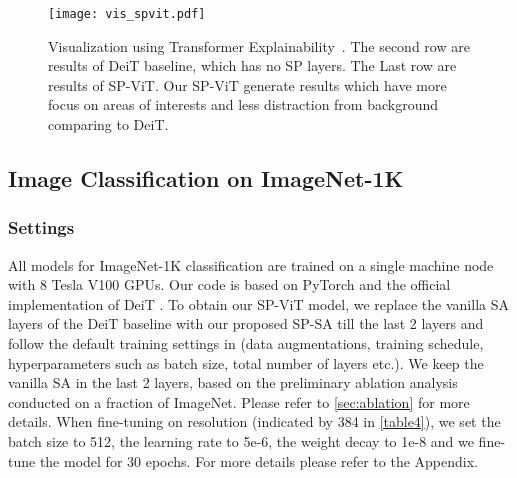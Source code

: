 \documentclass[authorversion, sigconf, acmthm=false, nonacm=true]{acmart}
\begin{document}
\begin{figure*}[h]
  \centering
\texttt{[image: vis\_spvit.pdf]} 

  \caption{Visualization using Transformer Explainability~\cite{Chefer_2021_CVPR}. The second row are results of DeiT baseline, which has no SP layers. The Last row are results of SP-ViT. Our SP-ViT generate results which have more focus on areas of interests and less distraction from background comparing to DeiT.}
\label{vis_spvit}
  \end{figure*}

\subsection{Image Classification on ImageNet-1K}
   
\subsubsection{Settings}


    












All models for ImageNet-1K classification are trained on a single machine node with 8 Tesla V100 GPUs.
Our code is based on PyTorch \cite{paszke2019pytorch} and the official implementation of DeiT \cite{touvron2021training}.
To obtain our SP-ViT model, 
we replace the vanilla SA layers of the DeiT baseline with our proposed SP-SA till the last 2 layers and follow the default training settings in \cite{jiang2021all} (data augmentations,
training schedule, hyperparameters such as batch size, total number of layers etc.). 
We keep the vanilla SA in the last 2 layers, based on the preliminary ablation analysis conducted on a fraction of ImageNet. 
Please refer to \cref{sec:ablation} for more details.
When fine-tuning on  resolution (indicated by 384 in \cref{table4}), we set the batch size to 512, the learning rate to 5e-6, the
weight decay to 1e-8 and we fine-tune the model for 30 epochs. For more details please refer to the Appendix. 
\end{document}
